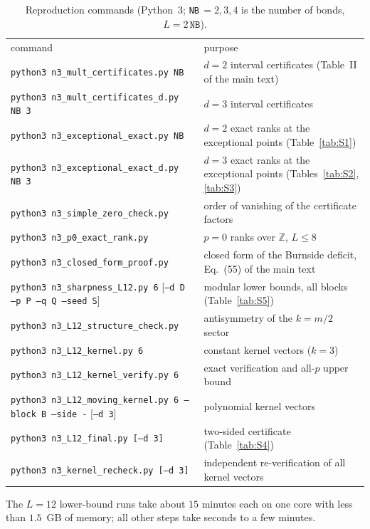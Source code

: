 \documentclass[aps,prx,reprint,superscriptaddress,nobibnotes,longbibliography]{revtex4-2}
\begin{document}
\begin{table}[t]
\caption{Reproduction commands (Python~3; \texttt{NB}$\,=2,3,4$ is the number of bonds, $L=2\,\texttt{NB}$).}
\label{tab:S9}
\footnotesize
\begin{ruledtabular}
\begin{tabular}{ll}
command & purpose\\
\colrule
\texttt{python3 n3\_mult\_certificates.py NB} & $d=2$ interval certificates (Table~II of the main text)\\
\texttt{python3 n3\_mult\_certificates\_d.py NB 3} & $d=3$ interval certificates\\
\texttt{python3 n3\_exceptional\_exact.py NB} & $d=2$ exact ranks at the exceptional points (Table~\ref{tab:S1})\\
\texttt{python3 n3\_exceptional\_exact\_d.py NB 3} & $d=3$ exact ranks at the exceptional points (Tables~\ref{tab:S2}, \ref{tab:S3})\\
\texttt{python3 n3\_simple\_zero\_check.py} & order of vanishing of the certificate factors\\
\texttt{python3 n3\_p0\_exact\_rank.py} & $p=0$ ranks over $\mathbb Z$, $L\le8$\\
\texttt{python3 n3\_closed\_form\_proof.py} & closed form of the Burnside deficit, Eq.~(55) of the main text\\
\texttt{python3 n3\_sharpness\_L12.py 6} [\texttt{--d D --p P --q Q --seed S}] & modular lower bounds, all blocks (Table~\ref{tab:S5})\\
\texttt{python3 n3\_L12\_structure\_check.py} & antisymmetry of the $k=m/2$ sector\\
\texttt{python3 n3\_L12\_kernel.py 6} & constant kernel vectors ($k=3$)\\
\texttt{python3 n3\_L12\_kernel\_verify.py 6} & exact verification and all-$p$ upper bound\\
\texttt{python3 n3\_L12\_moving\_kernel.py 6 --block B --side -} [\texttt{--d 3}] & polynomial kernel vectors\\
\texttt{python3 n3\_L12\_final.py [--d 3]} & two-sided certificate (Table~\ref{tab:S4})\\
\texttt{python3 n3\_kernel\_recheck.py [--d 3]} & independent re-verification of all kernel vectors\\
\end{tabular}
\end{ruledtabular}
\end{table}
The $L=12$ lower-bound runs take about $15$ minutes each on one core with less than $1.5$~GB of memory; all other steps take seconds to a few minutes.
\end{document}
